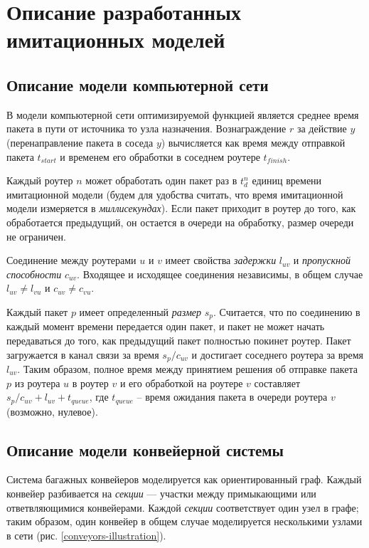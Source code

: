 \documentclass[specification, annotation]{itmo-student-thesis}
\begin{document}
\chapter{Описание разработанных имитационных моделей}\label{apx:simulators}

\section{Описание модели компьютерной сети}\label{apx:network-model}

В модели компьютерной сети оптимизируемой функцией является среднее время пакета в
пути от источника то узла назначения. Вознаграждение $r$ за действие $y$
(перенаправление пакета в соседа $y$) вычисляется как время между отправкой
пакета $t_{start}$ и временем его обработки в соседнем роутере $t_{finish}$.

Каждый роутер $n$ может обработать один пакет раз в $t_d^n$ единиц времени имитационной
модели (будем для удобства считать, что время имитационной модели измеряется в
\textit{миллисекундах}). Если пакет приходит в роутер до того, как обработается
предыдущий, он остается в очереди на обработку, размер очереди не ограничен.

Соединение между роутерами $u$ и $v$ имеет свойства \textit{задержки} $l_{uv}$ и
\textit{пропускной способности} $c_{uv}$. Входящее и исходящее соединения
независимы, в общем случае $l_{uv} \neq l_{vu}$ и $c_{uv} \neq c_{vu}$.

Каждый пакет $p$ имеет определенный \textit{размер} $s_p$.
Считается, что по соединению в каждый момент времени передается один пакет, и
пакет не может начать передаваться до того, как предыдущий пакет полностью
покинет роутер. Пакет загружается в канал связи за время $s_p / c_{uv}$ и
достигает соседнего роутера за время $l_{uv}$. Таким образом, полное время между
принятием решения об отправке пакета $p$ из роутера $u$ в роутер $v$ и его
обработкой на роутере $v$ составляет $s_p / c_{uv} + l_{uv} + t_{queue}$, где
$t_{queue}$ -- время ожидания пакета в очереди роутера $v$ (возможно, нулевое).

\section{Описание модели конвейерной системы}\label{apx:conveyor-model}

Система багажных конвейеров моделируется как ориентированный граф. Каждый
конвейер разбивается на \textit{секции} --- участки между примыкающими или
ответвляющимися конвейерами. Каждой \textit{секции} соответствует один узел в
графе; таким образом, один конвейер в общем случае моделируется несколькими
узлами в сети (рис. \ref{conveyors-illustration}).
\end{document}
